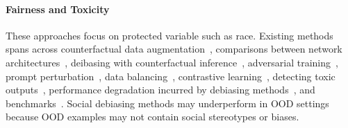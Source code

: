 \paragraph{Fairness and Toxicity} These approaches focus on protected variable such as race. Existing methods spans across counterfactual data augmentation~\citep{zmigrod-etal-2019-counterfactual,dinan-etal-2020-queens,barikeri-etal-2021-redditbias}, comparisons between network architectures~\citep{meade-etal-2022-empirical}, deibasing with counterfactual inference~\citep{qian-etal-2021-counterfactual}, adversarial training~\citep{madanagopal-caverlee-2023-bias}, prompt perturbation~\citep{guo-etal-2023-debias}, data balancing~\citep{han-etal-2022-balancing}, contrastive learning~\citep{cheng2021fairfil}, detecting toxic outputs~\citep{schick-etal-2021-self}, performance degradation incurred by debiasing methods~\citep{meade-etal-2022-empirical}, and benchmarks~\cite{nadeem-etal-2021-stereoset,hartvigsen-etal-2022-toxigen,sun-etal-2022-chapterbreak}. Social debiasing methods may underperform in OOD settings because OOD examples may not contain social stereotypes or biases.



